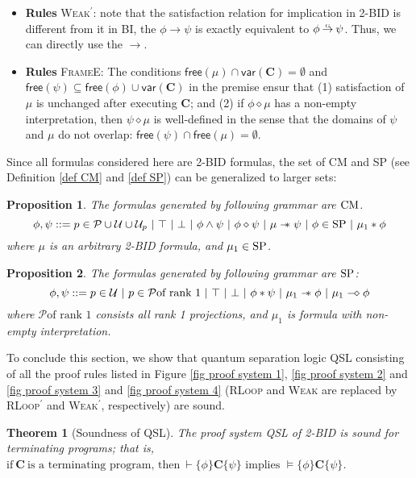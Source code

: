 \documentclass[conference,compsoc, 10pt]{IEEEtran}
\newtheorem{theorem}{Theorem}[section]
\newtheorem{proposition}{Proposition}[section]
\newcommand {\cP } {{\mathcal{P}}}
\newcommand {\cU } {{\mathcal{U}}}
\newcommand {\V }[1] {{\mathsf{free}{\left(#1\right)}}}
\newcommand {\var } {\mathsf{var}}
\newcommand {\prog } {{\mathbf{C}}}
\newcommand {\sepimp} {\mathrel{-\mkern-6mu*}}
\newcommand{\sd}{\diamond}%
\newcommand {\sdimp} {\mathrel{-\mkern-2.5mu\diamond}}
\DeclareRobustCommand{\gimp}{%
	\mathbin{\ooalign{$\rightarrow$\cr\hss\raisebox{1ex}{\scalebox{.5}{G}}\hss}}}
\begin{document}
\begin{appendices}
\begin{itemize}
			\item\textbf{Rules} \textsc{Weak$^\prime$}: note that the satisfaction relation for implication in 2-BID is different from it in BI, the $\phi\rightarrow\psi$ is exactly equivalent to $\phi\gimp\psi$. Thus, we can directly use the $\rightarrow$.	
			
			\item\textbf{Rules} \textsc{FrameE}: The conditions $\V{\mu}\cap\var(\prog)=\emptyset$ and $\V{\psi}\subseteq\V{\phi}\cup\var(\prog)$ in the premise ensur that (1) satisfaction of $\mu$ is unchanged after executing $\prog$; and (2) if $\phi\sd\mu$ has a non-empty interpretation, then $\psi\sd\mu$ is well-defined in the sense that the domains of $\psi$ and $\mu$ do not overlap: $\V{\psi}\cap\V{\mu}=\emptyset$.
		\end{itemize}
		
		Since all formulas considered here are 2-BID formulas, the set of CM and SP (see Definition \ref{def CM} and \ref{def SP}) can be generalized to larger sets:
		\begin{proposition}
			\label{prop CM 2BID}
			The formulas generated by following grammar are ${\rm CM}$. 
			$$
			\phi,\psi ::= p\in\cP\cup\cU\cup\cU_p\ |\ \top\ |\ \bot\ |\ \phi\wedge\psi\ |\ \phi\sd\psi\ |\ \mu \sepimp \psi\ |\ \phi\in{\rm SP}\ |\ \mu_1\ast\phi
			$$
			where $\mu$ is an arbitrary 2-BID formula, and $\mu_1\in {\rm SP}$.
		\end{proposition}
		\begin{proposition}
			\label{prop SP 2BID}
			The formulas generated by following grammar are ${\rm SP}$: 
			$$
			\phi,\psi ::= p\in\cU\ |\ p\in\cP \text{of rank 1}\ |\ \top\ |\ \bot\ |\ \phi\ast\psi\ |\ \mu_1 \sepimp \phi\ |\ \mu_1 \sdimp \phi
			$$
			where $\cP \text{of rank 1}$ consists all rank 1 projections, and $\mu_1$ is formula with non-empty interpretation.
		\end{proposition}
		
		
		To conclude this section, we show that quantum separation logic QSL consisting of all the proof rules listed in Figure \ref{fig proof system 1}, \ref{fig proof system 2} and \ref{fig proof system 3} and \ref{fig proof system 4} (\textsc{RLoop} and \textsc{Weak} are replaced by \textsc{RLoop$^\prime$} and \textsc{Weak$^\prime$}, respectively) are sound.
		
		\begin{theorem}[Soundness of QSL]
			\label{thm sound QSL 2BID}
			The proof system QSL of 2-BID is sound for terminating programs; that is, 
			$\text{if}\ \prog\ \text{is a terminating program, then}\ \vdash\{\phi\}\prog\{\psi\}\text{\ implies\ }\models\{\phi\}\prog\{\psi\}$.
		\end{theorem}	
		

\end{appendices}
\end{document}
